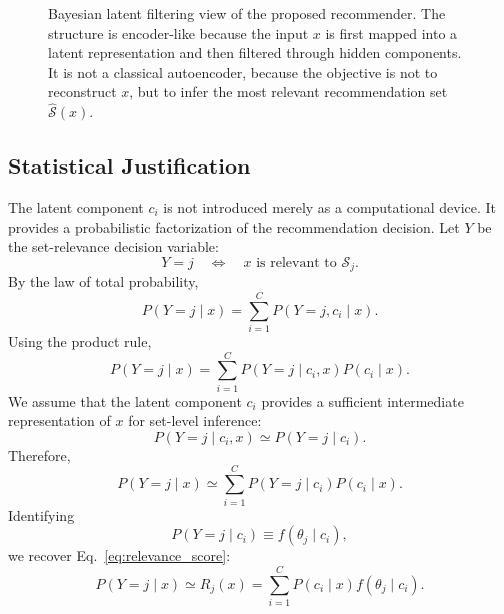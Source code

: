 \documentclass{article}
\theoremstyle{plain}
\theoremstyle{definition}
\theoremstyle{remark}
\begin{document}
\begin{figure}[t]
	\caption{Bayesian latent filtering view of the proposed recommender. The structure is encoder-like because the input \(x\) is first mapped into a latent representation and then filtered through hidden components. It is not a classical autoencoder, because the objective is not to reconstruct \(x\), but to infer the most relevant recommendation set \(\widehat{\mathcal S}(x)\).}
	\label{fig:bayesian_latent_filtering}
\end{figure}

\subsection{Statistical Justification}
\label{subsec:statistical_justification}

The latent component \(c_i\) is not introduced merely as a computational device. It provides a probabilistic factorization of the recommendation decision. Let \(Y\) be the set-relevance decision variable:
\[
Y=j
\quad\Longleftrightarrow\quad
x \text{ is relevant to } \mathcal S_j .
\]
By the law of total probability,
\begin{equation}
	\label{eq:total_probability}
	P(Y=j\mid x)
	=
	\sum_{i=1}^{C}
	P(Y=j,c_i\mid x).
\end{equation}
Using the product rule,
\begin{equation}
	\label{eq:product_rule}
	P(Y=j\mid x)
	=
	\sum_{i=1}^{C}
	P(Y=j\mid c_i,x)P(c_i\mid x).
\end{equation}
We assume that the latent component \(c_i\) provides a sufficient intermediate representation of \(x\) for set-level inference:
\begin{equation}
	\label{eq:conditional_sufficiency}
	P(Y=j\mid c_i,x)
	\simeq
	P(Y=j\mid c_i).
\end{equation}
Therefore,
\begin{equation}
	\label{eq:marginal_relevance}
	P(Y=j\mid x)
	\simeq
	\sum_{i=1}^{C}
	P(Y=j\mid c_i)P(c_i\mid x).
\end{equation}
Identifying
\[
P(Y=j\mid c_i)
\equiv
f(\theta_j\mid c_i),
\]
we recover Eq.~\eqref{eq:relevance_score}:
\[
P(Y=j\mid x)
\simeq
R_j(x)
=
\sum_{i=1}^{C}
P(c_i\mid x)f(\theta_j\mid c_i).
\]
\end{document}
